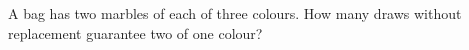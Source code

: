 A bag has two marbles of each of three colours. How many draws without replacement guarantee two of one colour?
